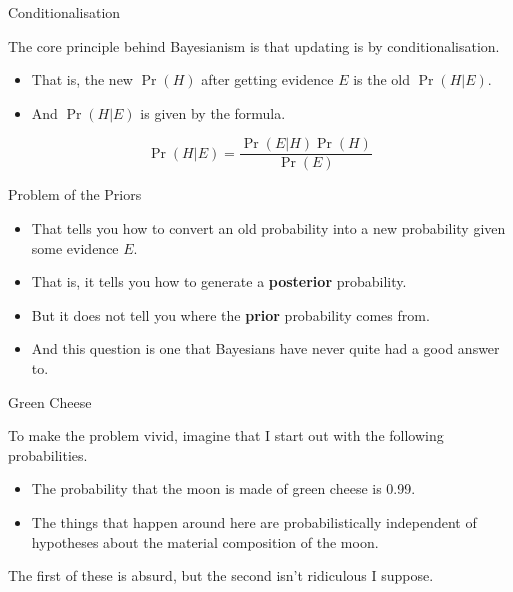 \documentclass[
  ignorenonframetext,
]{beamer}
\providecommand{\tightlist}{%
  \setlength{\itemsep}{0pt}\setlength{\parskip}{0pt}}
\renewcommand{\,}{\text{, }}
\begin{document}
\begin{frame}{Conditionalisation}
\protect\hypertarget{conditionalisation}{}

The core principle behind Bayesianism is that updating is by
conditionalisation.

\begin{itemize}
\tightlist
\item
  That is, the new \(\Pr(H)\) after getting evidence \(E\) is the old
  \(\Pr(H | E)\).
\item
  And \(\Pr(H | E)\) is given by the formula.
\end{itemize}

\[
\Pr(H | E) = \frac{\Pr(E | H)\Pr(H)}{\Pr(E)}
\]

\end{frame}

\begin{frame}{Problem of the Priors}
\protect\hypertarget{problem-of-the-priors}{}

\begin{itemize}
\tightlist
\item
  That tells you how to convert an old probability into a new
  probability given some evidence \(E\).
\item
  That is, it tells you how to generate a \textbf{posterior}
  probability. \pause
\item
  But it does not tell you where the \textbf{prior} probability comes
  from.
\item
  And this question is one that Bayesians have never quite had a good
  answer to.
\end{itemize}

\end{frame}

\begin{frame}{Green Cheese}
\protect\hypertarget{green-cheese}{}

To make the problem vivid, imagine that I start out with the following
probabilities.

\begin{itemize}
\tightlist
\item
  The probability that the moon is made of green cheese is 0.99.
\item
  The things that happen around here are probabilistically independent
  of hypotheses about the material composition of the moon.
\end{itemize}

The first of these is absurd, but the second isn't ridiculous I suppose.

\end{frame}
\end{document}
